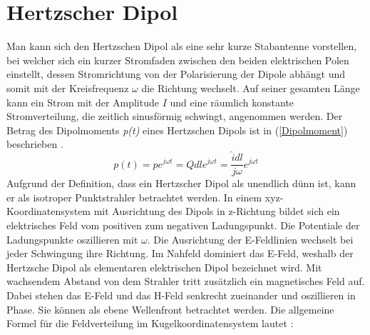 \section{Hertzscher Dipol}
Man kann sich den Hertzschen Dipol als eine sehr kurze Stabantenne vorstellen, bei welcher sich ein kurzer Stromfaden zwischen den beiden elektrischen Polen einstellt, dessen Stromrichtung von der Polarisierung der Dipole abhängt und somit mit der Kreisfrequenz $\omega $ die Richtung wechselt. Auf seiner gesamten Länge kann ein Strom mit der Amplitude $I$ und eine räumlich konstante Stromverteilung, die zeitlich sinusförmig schwingt, angenommen werden. Der Betrag des Dipolmoments \textit{p(t)} eines Hertzschen Dipols ist in (\ref{Dipolmoment}) beschrieben \cite{Emant}. 
\begin{equation}\label{Dipolmoment}
p(t)=pe^{j\omega t} = Q dl e^{j\omega t} = \frac{\hat{i} dl}{j\omega }e^{j\omega t}
\end{equation}
Aufgrund der Definition, dass ein Hertzscher Dipol als unendlich dünn ist, kann er als isotroper Punktstrahler betrachtet werden. In einem xyz-Koordinatensystem mit Ausrichtung des Dipols in z-Richtung bildet sich ein elektrisches Feld vom positiven zum negativen Ladungspunkt. Die Potentiale der Ladungspunkte oszillieren mit $\omega$. Die Ausrichtung der E-Feldlinien wechselt bei jeder Schwingung ihre Richtung. Im Nahfeld dominiert das E-Feld, weshalb der Hertzsche Dipol als elementaren elektrischen Dipol bezeichnet wird. Mit wachsendem Abstand von dem Strahler tritt zusätzlich ein magnetisches Feld auf. Dabei stehen das E-Feld und das H-Feld senkrecht zueinander und oszillieren in Phase. Sie können als ebene Wellenfront betrachtet werden. Die allgemeine Formel für die Feldverteilung im Kugelkoordinatensystem lautet \cite{elliott1981antenna}:







